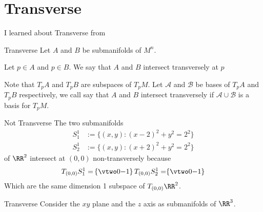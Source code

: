 \section{Transverse}

I learned about Transverse from \cite{lee_2013}

\begin{boxDefinition}{Transverse}
Let \( A \) and \( B \) be submanifolds of \( M^n \).

Let \( p \in A \) and \( p \in B \).
We say that \( A \) and \( B \) intersect transversely at \( p \)

Note that \( T_pA \) and \( T_pB \) are subspaces of \( T_pM \).
Let \( \mathcal A \) and \( \mathcal B \) be bases of \( T_pA \) and \(T_pB \) respectively,
    we call say that \( A \) and \( B \) intersect transversely if \( \mathcal A \cup \mathcal B \) is a basis for \( T_pM \).
\end{boxDefinition}
\begin{boxExample}{Not Transverse}
The two submanifolds
\begin{align*} 
    S_1^1 &:= \{ (x,y) : (x-2)^2 + y^2 = 2^2 \}
    \\
    S_2^1 &:= \{ (x,y) : (x+2)^2 + y^2 = 2^2 \}
\end{align*}
of \( \RR^2 \) intersect at \( (0, 0) \) non-transversely because 
\begin{align*} 
    T_{(0,0)}S_1^1 = \span \left\{ \vtwo 0{-1} \right\}
    T_{(0,0)}S_2^1 = \span \left\{ \vtwo 0{-1} \right\}
\end{align*}
Which are the same dimension 1 subspace of \( T_{(0,0)}\RR^2 \).
\end{boxExample}
\begin{boxExample}{Transverse}
Consider the \( xy \) plane and the \( z \) axis as submanifolds of \( \RR^3 \).
\end{boxExample}
